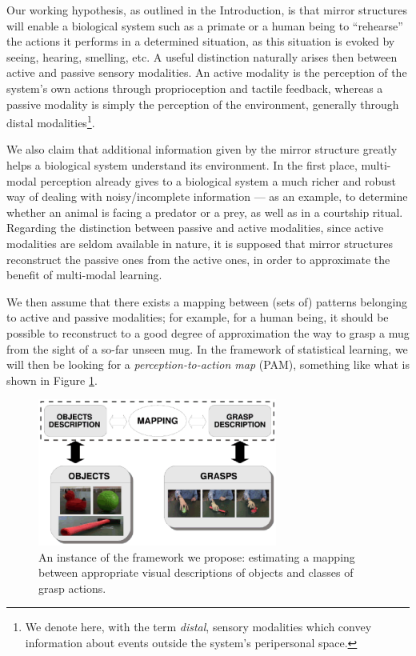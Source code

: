 Our working hypothesis, as outlined in the Introduction, is that
mirror structures will enable a biological system such as a primate or
a human being to ``rehearse'' the actions it performs in a determined situation,
as this situation is evoked by seeing, hearing, smelling, etc. A useful distinction
naturally arises then between active and passive sensory modalities. An active
modality is the perception of the system's own actions through proprioception
and tactile feedback, whereas a passive modality is simply the perception
of the environment, generally through distal modalities\footnote{We denote here,
with the term \emph{distal}, sensory modalities which convey information about
events outside the system's peripersonal space.}.

We also claim that additional information given by the mirror structure greatly
helps a biological system understand its environment. In the first place,
multi-modal perception \cite{...} already gives to a biological system a much
richer and robust way of dealing with noisy/incomplete information --- as an
example, to determine whether an animal is facing a predator or a prey, as well
as in a courtship ritual. Regarding the distinction between passive and active
modalities, since active modalities are seldom available in nature, it is supposed
that mirror structures reconstruct the passive ones from the active ones, in order to
approximate the benefit of multi-modal learning.

We then assume that there exists a mapping between (sets of) patterns belonging to
active and passive modalities; for example, for a human being, it should be possible
to reconstruct to a good degree of approximation the way to grasp a mug from the
sight of a so-far unseen mug. In the framework of statistical learning, we will
then be looking for a \emph{perception-to-action map} (PAM), something like what
is shown in Figure \ref{fig::implementation}.

\begin{figure}[h!]
  \centering
  \includegraphics[width=0.7\textwidth]{images/schema_implementazione}
  \caption{An instance of the framework we propose: estimating a
   mapping between appropriate visual descriptions of objects and
   classes of grasp actions.}
  \label{fig::implementation}
\end{figure}

